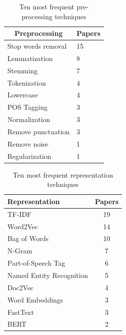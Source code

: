 \begin{table}[H]
\centering
\footnotesize
\caption{Ten most frequent pre-processing techniques}
\label{tab:rsl_freq_pre_processing}

    \begin{tabular}{@{}ll@{}}
    
    \toprule
    \multicolumn{1}{c}{\textbf{Preprocessing}} & \multicolumn{1}{c}{\textbf{Papers}} \\ \midrule
    Stop words removal                         & 15                                  \\
    Lemmatization                              & 8                                   \\
    Stemming                                   & 7                                   \\
    Tokenization                               & 4                                   \\
    Lowercase                                  & 4                                   \\
    POS Tagging                                & 3                                   \\
    Normalization                              & 3                                   \\
    Remove punctuation                         & 3                                   \\
    Remove noise                               & 1                                   \\
    Regularization                             & 1                                   \\ \bottomrule
    
    \end{tabular}
\end{table}


\begin{table}[H]
\centering
\footnotesize
\caption{Ten most frequent representation techniques}
\label{tab:rsl_freq_representation}
\begin{tabular}{@{}lc@{}}
\toprule
\textbf{Representation}  & \textbf{Papers} \\ \midrule
TF-IDF                   & 19              \\
Word2Vec                 & 14              \\
Bag of Words             & 10              \\
N-Gram                   & 7               \\
Part-of-Speech Tag       & 6               \\
Named Entity Recognition & 5               \\
Doc2Vec                  & 4               \\
Word Embeddings          & 3               \\
FastText                 & 3               \\ 
BERT                     & 2               \\ \bottomrule
\end{tabular}
\end{table}

